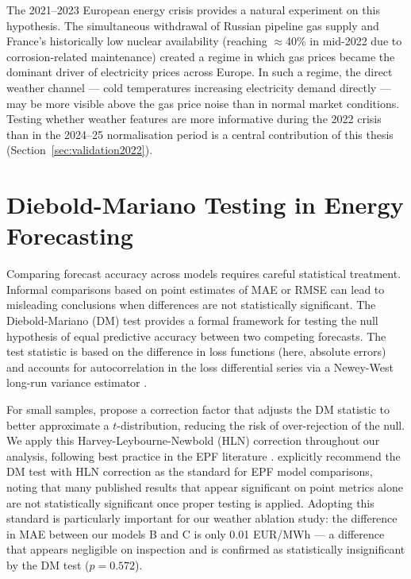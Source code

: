 The 2021--2023 European energy crisis provides a natural experiment on this
hypothesis. The simultaneous withdrawal of Russian pipeline gas supply and
France's historically low nuclear availability (reaching $\approx$40\% in
mid-2022 due to corrosion-related maintenance) created a regime in which gas
prices became the dominant driver of electricity prices across Europe. In such
a regime, the direct weather channel — cold temperatures increasing electricity
demand directly — may be more visible above the gas price noise than in normal
market conditions. Testing whether weather features are more informative during
the 2022 crisis than in the 2024--25 normalisation period is a central
contribution of this thesis (Section~\ref{sec:validation2022}).

\section{Diebold-Mariano Testing in Energy Forecasting}

Comparing forecast accuracy across models requires careful statistical
treatment. Informal comparisons based on point estimates of MAE or RMSE can
lead to misleading conclusions when differences are not statistically
significant. The Diebold-Mariano (DM) test \citep{diebold1995} provides a
formal framework for testing the null hypothesis of equal predictive accuracy
between two competing forecasts. The test statistic is based on the difference
in loss functions (here, absolute errors) and accounts for autocorrelation in
the loss differential series via a Newey-West long-run variance estimator
\citep{newbold1993}.

For small samples, \citet{harvey1997} propose a correction factor that adjusts
the DM statistic to better approximate a $t$-distribution, reducing the risk
of over-rejection of the null. We apply this Harvey-Leybourne-Newbold (HLN)
correction throughout our analysis, following best practice in the EPF
literature \citep{weron2014}. \citet{lago2021} explicitly recommend the
DM test with HLN correction as the standard for EPF model comparisons, noting
that many published results that appear significant on point metrics alone are
not statistically significant once proper testing is applied. Adopting this
standard is particularly important for our weather ablation study: the
difference in MAE between our models B and C is only 0.01 EUR/MWh — a
difference that appears negligible on inspection and is confirmed as
statistically insignificant by the DM test ($p = 0.572$).

